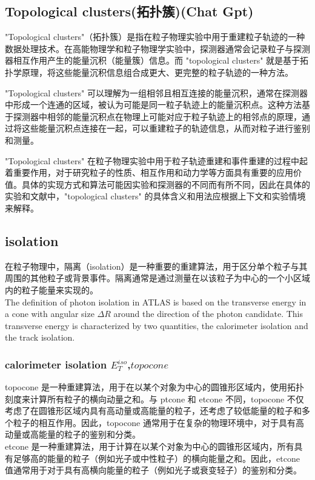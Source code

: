 \documentclass{ctexart}
\begin{document}
\subsection{Topological clusters(拓扑簇)(Chat Gpt)}
"Topological clusters"（拓扑簇）是指在粒子物理实验中用于重建粒子轨迹的一种数据处理技术。在高能物理学和粒子物理学实验中，探测器通常会记录粒子与探测器相互作用产生的能量沉积（能量簇）信息。而 "topological clusters" 就是基于拓扑学原理，将这些能量沉积信息组合成更大、更完整的粒子轨迹的一种方法。

"Topological clusters" 可以理解为一组相邻且相互连接的能量沉积，通常在探测器中形成一个连通的区域，被认为可能是同一粒子轨迹上的能量沉积点。这种方法基于探测器中相邻的能量沉积点在物理上可能对应于粒子轨迹上的相邻点的原理，通过将这些能量沉积点连接在一起，可以重建粒子的轨迹信息，从而对粒子进行鉴别和测量。

"Topological clusters" 在粒子物理实验中用于粒子轨迹重建和事件重建的过程中起着重要作用，对于研究粒子的性质、相互作用和动力学等方面具有重要的应用价值。具体的实现方式和算法可能因实验和探测器的不同而有所不同，因此在具体的实验和文献中，"topological clusters" 的具体含义和用法应根据上下文和实验情境来解释。
\subsection{isolation}
在粒子物理中，隔离（isolation）是一种重要的重建算法，用于区分单个粒子与其周围的其他粒子或背景事件。隔离通常是通过测量在以该粒子为中心的一个小区域内的粒子能量来实现的。\\

The definition of photon isolation in ATLAS is based on the transverse energy in a cone with angular size $\Delta R$ around the direction of the photon candidate. This transverse energy is characterized by two quantities, the calorimeter isolation and the track isolation.
\subsubsection{calorimeter isolation $E_T^{iso}$,$topocone$}
topocone 是一种重建算法，用于在以某个对象为中心的圆锥形区域内，使用拓扑刻度来计算所有粒子的横向动量之和。与 ptcone 和 etcone 不同，topocone 不仅考虑了在圆锥形区域内具有高动量或高能量的粒子，还考虑了较低能量的粒子和多个粒子的相互作用。因此，topocone 通常用于在复杂的物理环境中，对于具有高动量或高能量的粒子的鉴别和分类。\\

etcone 是一种重建算法，用于计算在以某个对象为中心的圆锥形区域内，所有具有足够高的能量的粒子（例如光子或中性粒子）的横向能量之和。因此，etcone 值通常用于对于具有高横向能量的粒子（例如光子或衰变轻子）的鉴别和分类。\\
\end{document}
